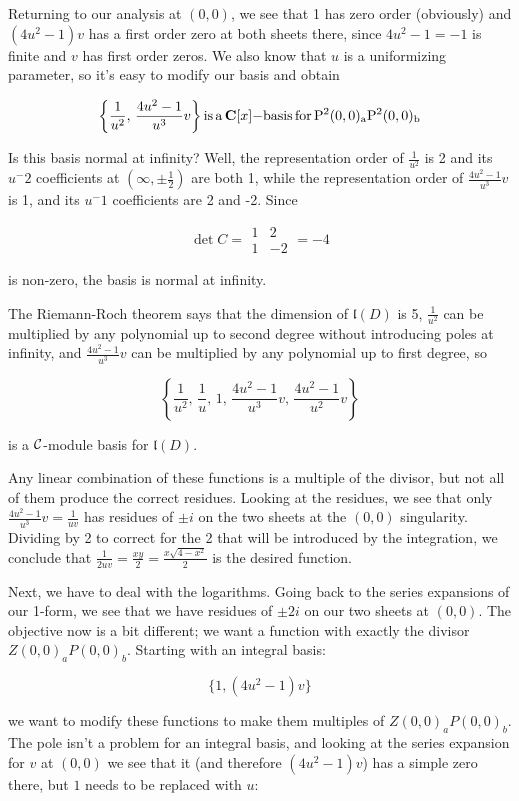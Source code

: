 Returning to our analysis at $(0,0)$, we see that 1 has zero order
(obviously) and $(4u^2-1)v$ has a first order zero at both sheets
there, since $4u^2-1=-1$ is finite and $v$ has first order zeros.
We also know that $u$ is a uniformizing parameter, so it's easy
to modify our basis and obtain

$$\left\{\frac{1}{u^2},\,\frac{4u^2-1}{u^3}v\right\} {\rm is\, a\,} {\bf C}[x]{\rm -basis\, for\, P^2(0,0)_aP^2(0,0)_b}$$

Is this basis normal at infinity?  Well, the representation order of
$\frac{1}{u^2}$ is 2 and its $u^-2$ coefficients at $(\infty, \pm
\frac12)$ are both 1, while the representation order of $\frac{4u^2-1}{u^3}v$
is 1, and its $u^-1$ coefficients are 2 and -2.  Since

$$\det C = \begin{array}{|cc|} 1 & 2 \\ 1 & -2 \end{array} = -4$$

is non-zero, the basis is normal at infinity.

The Riemann-Roch theorem says that the dimension of ${\mathfrak l}(D)$ is 5,
$\frac{1}{u^2}$ can be multiplied by any polynomial up to second
degree without introducing poles at infinity, and $\frac{4u^2-1}{u^3}v$
can be multiplied by any polynomial up to first degree, so

$$\left\{\frac{1}{u^2},\, \frac{1}{u},\, 1,\, \frac{4u^2-1}{u^3}v,\, \frac{4u^2-1}{u^2}v\right\}$$

is a ${\cal C}$-module basis for ${\mathfrak l}(D)$.

Any linear combination of these functions is a multiple of the
divisor, but not all of them produce the correct residues.  Looking at
the residues, we see that only $\frac{4u^2-1}{u^3}v = \frac{1}{uv}$
has residues of $\pm i$ on the two sheets at the $(0,0)$ singularity.
Dividing by 2 to correct for the 2 that will be introduced by the
integration, we conclude that $\frac{1}{2uv} = \frac{xy}{2} =
\frac{x\sqrt{4-x^2}}{2}$ is the desired function.

Next, we have to deal with the logarithms.  Going back to the
series expansions of our 1-form, we see that we have residues
of $\pm 2i$ on our two sheets at $(0,0)$.  The objective
now is a bit different; we want a function with exactly
the divisor $Z(0,0)_a P(0,0)_b$.  Starting with an integral basis:

$$\{1, (4u^2-1)v\}$$

we want to modify these functions to make them multiples
of $Z(0,0)_a P(0,0)_b$.  The pole isn't a problem for
an integral basis, and looking at the series expansion
for $v$ at $(0,0)$ we see that it (and therefore $(4u^2-1)v$)
has a simple zero there, but $1$ needs to be replaced with $u$:

